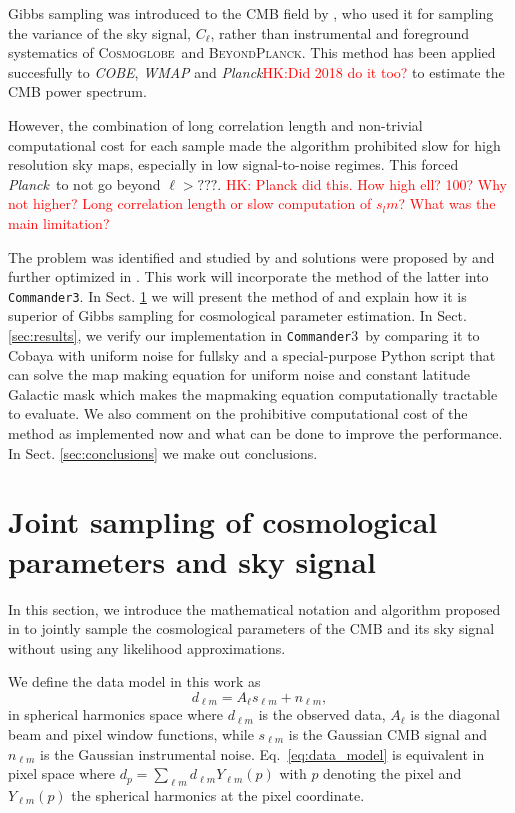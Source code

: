 \documentclass[twocolumn]{../common/aa}
\def\WMAP{\emph{WMAP}}
\def\COBE{\emph{COBE}}
\def\Planck{\emph{Planck}}
\def\commander{\texttt{Commander}}
\def\commanderthree{\texttt{Commander3}}
\newcommand{\BP}{\textsc{BeyondPlanck}}
\newcommand{\cosmoglobe}{\textsc{Cosmoglobe}}
\begin{document}
Gibbs sampling was introduced to the CMB field by \citet{jewell2004}, who used it for sampling the variance of the sky signal, $C_{\ell}$, rather than instrumental and foreground systematics of \cosmoglobe\ and \BP. This method has been applied succesfully to \COBE\citep{wandelt2004}, \WMAP\citep{Eriksen:2007jw} and \Planck\citep{planck2014-a13}\textcolor{red}{HK:Did 2018 do it too?} to estimate the CMB power spectrum.

However, the combination of long correlation length and non-trivial computational cost for each sample made the algorithm prohibited slow for high resolution sky maps, especially in low signal-to-noise regimes. This forced \Planck\ to not go beyond $\ell > ???$. \textcolor{red}{HK: Planck did this. How high ell? 100? Why not higher? Long correlation length or slow computation of $s_lm$? What was the main limitation?}

The problem was identified and studied by \cite{Eriksen:2004ss} and solutions were proposed by \cite{jewell:2009} and further optimized in \citet{racine:2016}. This work will incorporate the method of the latter into \commanderthree. In Sect. \ref{sec:methods} we will present the method of \citet{racine:2016} and explain how it is superior of Gibbs sampling for cosmological parameter estimation. In Sect. \ref{sec:results}, we verify our implementation in \commander3\ by comparing it to Cobaya with uniform noise for fullsky and a special-purpose Python script that can solve the map making equation for uniform noise and constant latitude Galactic mask which makes the mapmaking equation computationally tractable to evaluate. We also comment on the prohibitive computational cost of the method as implemented now and what can be done to improve the performance. In Sect. \ref{sec:conclusions} we make out conclusions.

\section{Joint sampling of cosmological parameters and sky signal}
\label{sec:methods}

In this section, we introduce the mathematical notation and algorithm proposed in \citet{racine:2016} to jointly sample the cosmological parameters of the CMB and its sky signal without using any likelihood approximations.

We define the data model in this work as
\begin{equation}
    \label{eq:data_model}
    d_{\ell m} = A_{\ell} s_{\ell m} + n_{\ell m},
\end{equation}
in spherical harmonics space where $d_{\ell m}$ is the observed data, $A_\ell$ is the diagonal beam and pixel window functions, while $s_{\ell m}$ is the Gaussian CMB signal and $n_{\ell m}$ is the Gaussian instrumental noise. Eq.~\eqref{eq:data_model} is equivalent in pixel space where ${d_p = \sum_{\ell m} d_{\ell m} Y_{\ell m}(p)}$ with $p$ denoting the pixel and $Y_{\ell m}(p)$ the spherical harmonics at the pixel coordinate.
\end{document}
